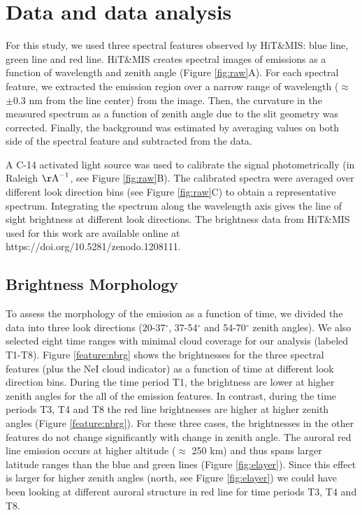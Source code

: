 \section{Data and data analysis}
For this study, we used three spectral features observed by HiT\&MIS: blue line, green line and red line. HiT\&MIS creates spectral images of emissions as a function of wavelength and zenith angle (Figure \ref{fig:raw}A). For each spectral feature, we extracted the emission region over a narrow range of wavelength ($\approx$ $\pm$0.3 nm from the line center) from the image. Then, the curvature in the measured spectrum as a function of zenith angle due to the slit geometry was corrected. Finally, the background was estimated by averaging values on both side of the spectral feature and subtracted from the data.

A C-14 activated light source was used to calibrate the signal photometrically (in Raleigh $\rm {\AA}^{-1}$, see Figure \ref{fig:raw}B). The calibrated spectra were averaged over different look direction bins (see Figure \ref{fig:raw}C) to obtain a representative spectrum. Integrating the spectrum along the wavelength axis gives the line of sight brightness at different look directions. The brightness data from HiT\&MIS used for this work are available online at https://doi.org/10.5281/zenodo.1208111.

\subsection{Brightness Morphology} 
\label{sec:bmorph}
To assess the morphology of the emission as a function of time, we divided the data into three look directions (20-37$^\circ$, 37-54$^\circ$ and 54-70$^\circ$ zenith angles). We also selected eight time ranges with minimal cloud coverage for our analysis (labeled T1-T8).
Figure \ref{feature:nbrg} shows the brightnesses for the three spectral features (plus the NeI cloud indicator) as a function of time at different look direction bins. During the time period T1, the brightness are lower at higher zenith angles for the all of the emission features. In contrast, during the time periods T3, T4 and T8 the red line brightnesses are higher at higher zenith angles (Figure \ref{feature:nbrg}). For these three cases, the brightnesses in the other features do not change significantly with change in zenith angle. The auroral red line emission occurs at higher altitude ($\approx$  250 km) and thus spans larger latitude ranges than the blue and green lines (Figure \ref{fig:elayer}). Since this effect is larger for higher zenith angles (north, see Figure \ref{fig:elayer}) we could have been looking at different auroral structure in red line for time periods T3, T4 and T8. 


